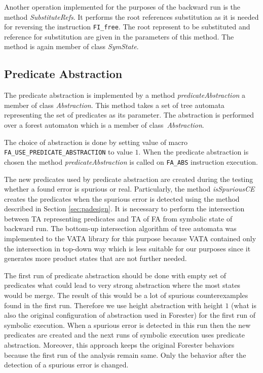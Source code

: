 Another operation implemented for the purposes of the backward run is
the method \emph{SubstituteRefs}.
It performs the root references substitution as it is needed
for reversing the instruction {\tt FI\_free}.
The root represent to be substituted and reference for substitution are
given in the parameters of this method.
The method is again member of class \emph{SymState}.

\subsection{Predicate Abstraction}
\label{subsec:paimpl}

The predicate abstraction is implemented by a method \emph{predicateAbstraction}
a member of class \emph{Abstraction}.
This method takes a set of tree automata representing the set of predicates
as its parameter.
The abstraction is performed over a forest automaton which is a member of
class~\emph{Abstraction}.

The choice of abstraction is done by setting value of macro
{\tt FA\_USE\_PREDICATE\_ABSTRACTION} to value $1$.
When the predicate abstraction is chosen the method \emph{predicateAbstraction}
is called on {\tt FA\_ABS} instruction execution.

The new predicates used by predicate abstraction are created during
the testing whether a found error is spurious or real.
Particularly, the method \emph{isSpuriousCE} creates the predicates
when the spurious error is detected using the method described
in Section \ref{sec:padesign}.
It is necessary to perform the intersection between TA representing
predicates and TA of FA from symbolic state of backward run.
The bottom-up intersection algorithm of tree automata was implemented
to the VATA library for this purpose because VATA contained only the
intersection in top-down way which is less suitable for our purposes since
it generates more product states that are not further needed.

The first run of predicate abstraction should be done
with empty set of predicates what could lead to very
strong abstraction where the most states would be merge.
The result of this would be a lot of spurious counterexamples found
in the first run.
Therefore we use height abstraction with height $1$ (what is
also the original configuration of abstraction used in Forester)
for the first run of symbolic execution.
When a spurious error is detected in this run then the new
predicates are created and the next runs of symbolic execution uses predicate abstraction.
Moreover, this approach keeps the original Forester behaviors
because the first run of the analysis remain same.
Only the behavior after the detection of a spurious error is changed.


